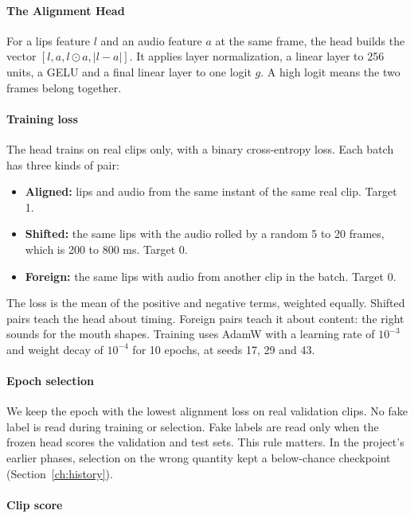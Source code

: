 \paragraph{The Alignment Head}

For a lips feature $l$ and an audio feature $a$ at the same frame, the head
builds the vector $[l, a, l \odot a, |l - a|]$. It applies layer
normalization, a linear layer to 256 units, a GELU and a final linear layer to
one logit $g$. A high logit means the two frames belong together.

\paragraph{Training loss}

The head trains on real clips only, with a binary cross-entropy loss. Each
batch has three kinds of pair:

\begin{itemize}
    \item \textbf{Aligned:} lips and audio from the same instant of the same
    real clip. Target 1.
    \item \textbf{Shifted:} the same lips with the audio rolled by a random 5
    to 20 frames, which is 200 to 800 ms. Target 0.
    \item \textbf{Foreign:} the same lips with audio from another clip in the
    batch. Target 0.
\end{itemize}

The loss is the mean of the positive and negative terms, weighted equally.
Shifted pairs teach the head about timing. Foreign pairs teach it about
content: the right sounds for the mouth shapes. Training uses AdamW with a
learning rate of $10^{-3}$ and weight decay of $10^{-4}$ for 10 epochs, at
seeds 17, 29 and 43.

\paragraph{Epoch selection}

We keep the epoch with the lowest alignment loss on real validation clips. No
fake label is read during training or selection. Fake labels are read only
when the frozen head scores the validation and test sets. This rule matters.
In the project's earlier phases, selection on the wrong quantity kept a
below-chance checkpoint (Section~\ref{ch:history}).

\paragraph{Clip score}

